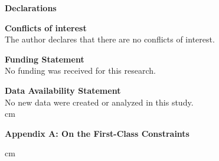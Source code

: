 \documentclass[12pt]{article}
\begin{document}
\vskip 0.3cm

\noindent
{\bf Declarations} \\

\vskip 0.3cm

\noindent
{\bf Conflicts of interest}\\ 



\noindent
The author declares that there are no conflicts of interest.\\

\vskip 0.3cm


\noindent
{\bf Funding Statement}\\



\noindent
No funding was received for this research.\\


\vskip 0.3cm


\noindent
{\bf Data Availability Statement}\\



\noindent
No new data were created or analyzed in this study.\\



 cm 
\begin{center}
{\bf Appendix A: \bf On the First-Class Constraints}\\
\end{center}


 cm 
\end{document}
